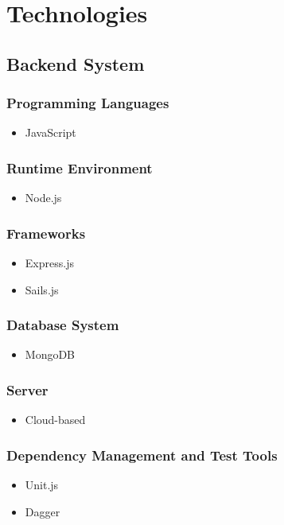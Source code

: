 \documentclass[11pt,fleqn]{book} %
\begin{document}
	
	\chapter{Technologies}
	
	\section{Backend System}
	\subsection{Programming Languages}
	\begin{itemize}
		\item JavaScript
	\end{itemize}
	\subsection{Runtime Environment}
	\begin{itemize}
		\item Node.js
	\end{itemize}
	\subsection{Frameworks}
	\begin{itemize}
		\item Express.js
		\item Sails.js
	\end{itemize}
	\subsection{Database System}
	\begin{itemize}
		\item MongoDB
	\end{itemize}
	\subsection{Server}
	\begin{itemize}
		\item Cloud-based
	\end{itemize}
	\subsection{Dependency Management and Test Tools}
	\begin{itemize}
		\item Unit.js
		\item Dagger
	\end{itemize}
\end{document}
